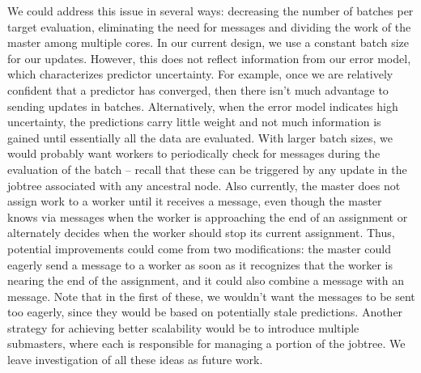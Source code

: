 \documentclass[angelino.tex]{subfiles}
\begin{document}
We could address this issue in several ways:  decreasing the number of batches
per target evaluation, eliminating the need for \WANTWORK messages
and dividing the work of the master among multiple cores.
%
In our current design, we use a constant batch size for our updates.
However, this does not reflect information from our error model,
which characterizes predictor uncertainty.
For example, once we are relatively confident that a predictor has converged,
then there isn't much advantage to sending updates in batches.
Alternatively, when the error model indicates high uncertainty, the predictions
carry little weight and not much information is gained until essentially all the
data are evaluated.
With larger batch sizes, we would probably want workers to periodically check
for \ABANDON messages during the evaluation of the batch -- recall that these
can be triggered by any update in the jobtree associated with any ancestral node.
%
Also currently, the master does not assign work to a worker
until it receives a \WANTWORK message, even though the master knows via
\UPDATE messages when the worker is approaching the end of an assignment
or alternately decides when the worker should stop its current assignment.
Thus, potential improvements could come from two modifications:
the master could eagerly send a \HAVEWORK message to a worker as soon as
it recognizes that the worker is nearing the end of the assignment, and
it could also combine a \HAVEWORK message with an \ABANDON message. 
Note that in the first of these, we wouldn't want the \HAVEWORK messages to be
sent too eagerly, since they would be based on potentially stale predictions.
%
Another strategy for achieving better scalability would be to introduce multiple
submasters, where each is responsible for managing a portion of the jobtree.
%
We leave investigation of all these ideas as future work.
\end{document}
